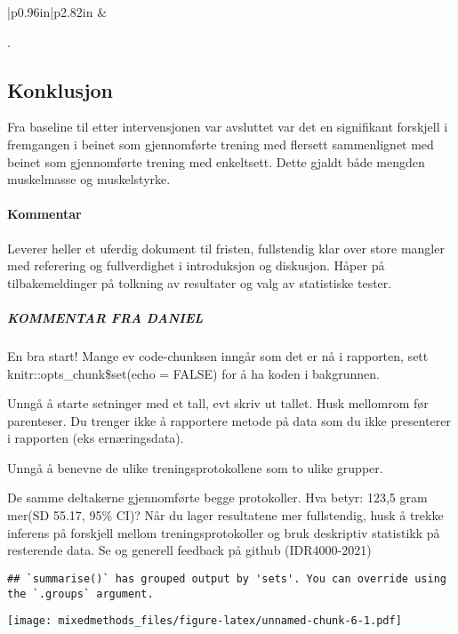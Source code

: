 \documentclass[
]{article}
\begin{document}
\begin{longtable}[c]{|p{0.96in}|p{2.82in}}
 &  \\

\noalign{\global\setlength{\arrayrulewidth}{2pt}}



\end{longtable}

.

\hypertarget{konklusjon}{%
\subsection{Konklusjon}\label{konklusjon}}

Fra baseline til etter intervensjonen var avsluttet var det en
signifikant forskjell i fremgangen i beinet som gjennomførte trening med
flersett sammenlignet med beinet som gjennomførte trening med
enkeltsett. Dette gjaldt både mengden muskelmasse og muskelstyrke.

\hypertarget{kommentar}{%
\paragraph{Kommentar}\label{kommentar}}

Leverer heller et uferdig dokument til fristen, fullstendig klar over
store mangler med referering og fullverdighet i introduksjon og
diskusjon. Håper på tilbakemeldinger på tolkning av resultater og valg
av statistiske tester.

\hypertarget{kommentar-fra-daniel}{%
\subparagraph{KOMMENTAR FRA DANIEL}\label{kommentar-fra-daniel}}

En bra start! Mange ev code-chunksen inngår som det er nå i rapporten,
sett knitr::opts\_chunk\$set(echo = FALSE) for å ha koden i bakgrunnen.

Unngå å starte setninger med et tall, evt skriv ut tallet. Husk
mellomrom før parenteser. Du trenger ikke å rapportere metode på data
som du ikke presenterer i rapporten (eks ernæringsdata).

Unngå å benevne de ulike treningsprotokollene som to ulike grupper.

De samme deltakerne gjennomførte begge protokoller. Hva betyr: 123,5
gram mer(SD 55.17, 95\% CI)? Når du lager resultatene mer fullstendig,
husk å trekke inferens på forskjell mellom treningsprotokoller og bruk
deskriptiv statistikk på resterende data. Se og generell feedback på
github (IDR4000-2021)

\begin{verbatim}
## `summarise()` has grouped output by 'sets'. You can override using the `.groups` argument.
\end{verbatim}

\texttt{[image: mixedmethods\_files/figure-latex/unnamed-chunk-6-1.pdf]}
\end{document}
